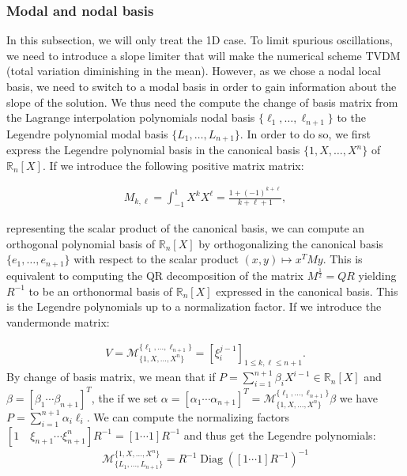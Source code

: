 \documentclass[10pt]{article}
\begin{document}
\subsubsection{Modal and nodal basis}
In this subsection, we will only treat the 1D case. To limit spurious oscillations, we need to introduce a slope limiter that will make the numerical scheme TVDM (total variation diminishing in the mean). However, as we chose a nodal local basis, we need to switch to a modal basis in order to gain information about the slope of the solution. We thus need the compute the change of basis matrix from the Lagrange interpolation polynomials nodal basis \(\{\ell_1,\ldots, \ell_{n+1}\}\) to the Legendre polynomial modal basis \(\{L_1,\ldots, L_{n+1}\}\). In order to do so, we first express the Legendre polynomial basis in the canonical basis \(\{1, X, \ldots, X^n\}\) of \(\mathbb{R}_n[X]\). If we introduce the following positive matrix matrix:

\begin{align*}
  M_{k,\ell} = \int_{-1}^1 X^k X^\ell = \frac{1+(-1)^{k+\ell}}{k+\ell+1},
\end{align*}

representing the scalar product of the canonical basis, we can compute an orthogonal polynomial basis of \(\mathbb{R}_n[X]\) by orthogonalizing the canonical basis \(\{e_1,\ldots,e_{n+1}\}\) with respect to the scalar product \((x,y)\mapsto x^TMy\). This is equivalent to computing the QR decomposition of the matrix \(M^\frac12=QR\) yielding \(R^{-1}\) to be an orthonormal basis of \(\mathbb{R}_n[X]\) expressed in the canonical basis. This is the Legendre polynomials up to a normalization factor. If we introduce the vandermonde matrix:

\begin{align*}
  V = \mathcal{M}_{\{1,X,\ldots, X^n\}}^{\{\ell_1,\ldots, \ell_{n+1}\}} = [\xi_i^{j-1}]_{1\leq k,\ell\leq n+1}.
\end{align*}
By change of basis matrix, we mean that if \(P = \sum_{i=1}^{n+1}\beta_i X^{i-1}\in\mathbb{R}_n[X]\) and \(\mathbb{\beta} = [\beta_1 \cdots \beta_{n+1}]^T\), the if we set \(\alpha = [\alpha_1 \cdots \alpha_{n+1}]^T = \mathcal{M}_{\{1,X,\ldots,X^n\}}^{\{\ell_1,\ldots, \ell_{n+1}\}}\beta\) we have \(P = \sum_{i=1}^{n+1}\alpha_i\ell_i\). We can compute the normalizing factors \([1\quad \xi_{n+1} \cdots \xi_{n+1}^n]R^{-1} = [1 \cdots 1]R^{-1}\) and thus get the Legendre polynomials:
\begin{align*}
  \mathcal{M}^{\{1, X, \ldots, X^n\}}_{\{L_1,\ldots, L_{n+1}\}} = R^{-1}\operatorname{Diag}([1\cdots 1]R^{-1})^{-1}
\end{align*}
\end{document}
